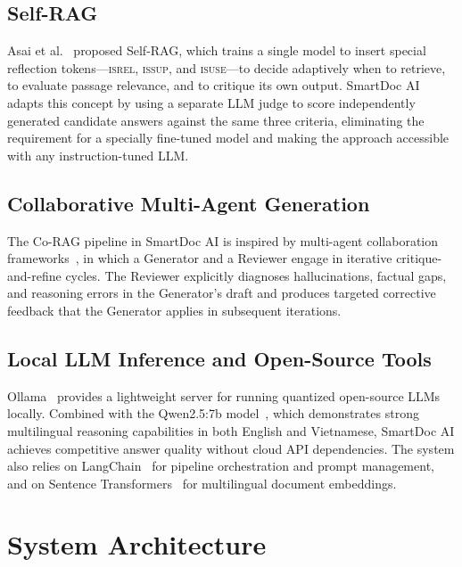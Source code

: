 \documentclass[10pt, conference, a4paper, compsocconf]{IEEEtran}
\begin{document}
\subsection{Self-RAG}
Asai et al.~\cite{selfrag_asai2023} proposed Self-RAG, which trains a
single model to insert special reflection tokens---\textsc{isrel},
\textsc{issup}, and \textsc{isuse}---to decide adaptively when to retrieve,
to evaluate passage relevance, and to critique its own output.
SmartDoc AI adapts this concept by using a separate LLM judge to score
independently generated candidate answers against the same three criteria,
eliminating the requirement for a specially fine-tuned model and making the
approach accessible with any instruction-tuned LLM.

\subsection{Collaborative Multi-Agent Generation}
The Co-RAG pipeline in SmartDoc AI is inspired by multi-agent
collaboration frameworks~\cite{corag_jin2025}, in which a Generator and a
Reviewer engage in iterative critique-and-refine cycles. The Reviewer
explicitly diagnoses hallucinations, factual gaps, and reasoning errors in
the Generator's draft and produces targeted corrective feedback that the
Generator applies in subsequent iterations.

\subsection{Local LLM Inference and Open-Source Tools}
Ollama~\cite{ollama} provides a lightweight server for running quantized
open-source LLMs locally. Combined with the Qwen2.5:7b model~\cite{qwen25},
which demonstrates strong multilingual reasoning capabilities in both
English and Vietnamese, SmartDoc AI achieves competitive answer quality
without cloud API dependencies. The system also relies on
LangChain~\cite{langchain} for pipeline orchestration and prompt
management, and on Sentence Transformers~\cite{reimers2019} for
multilingual document embeddings.


\section{System Architecture}
\end{document}
